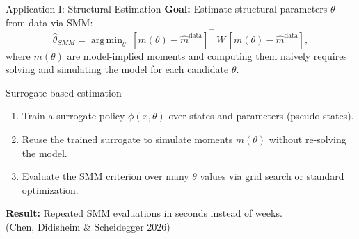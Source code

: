 \documentclass[aspectratio=169,11pt]{beamer}
\newcommand{\emphc}[1]{\textcolor{harvardcrimson}{#1}}
\DeclareMathOperator*{\argmin}{arg\,min}
\begin{document}
\begin{frame}{Application I: Structural Estimation}
\small
\textbf{Goal:} Estimate structural parameters $\theta$ from data via SMM:
\[
\hat{\theta}_{SMM} = \argmin_\theta\; [m(\theta)-\hat{m}^{\mathrm{data}}]^\top \, W \, [m(\theta)-\hat{m}^{\mathrm{data}}],
\]
where $m(\theta)$ are model-implied moments and computing them naively requires solving and simulating the model for each candidate $\theta$.

\vspace{0.15cm}
\begin{block}{Surrogate-based estimation}
\begin{enumerate}\itemsep0pt
  \item Train a surrogate policy $\phi(x,\theta)$ over \emphc{states and parameters} (pseudo-states).
  \item Reuse the trained surrogate to simulate moments $m(\theta)$ without re-solving the model.
  \item Evaluate the SMM criterion over many $\theta$ values via grid search or standard optimization.
\end{enumerate}
\end{block}

\vspace{0.15cm}
\textbf{Result:} Repeated SMM evaluations in \emphc{seconds} instead of weeks.\\
(Chen, Didisheim \& Scheidegger 2026)
\end{frame}
\end{document}
